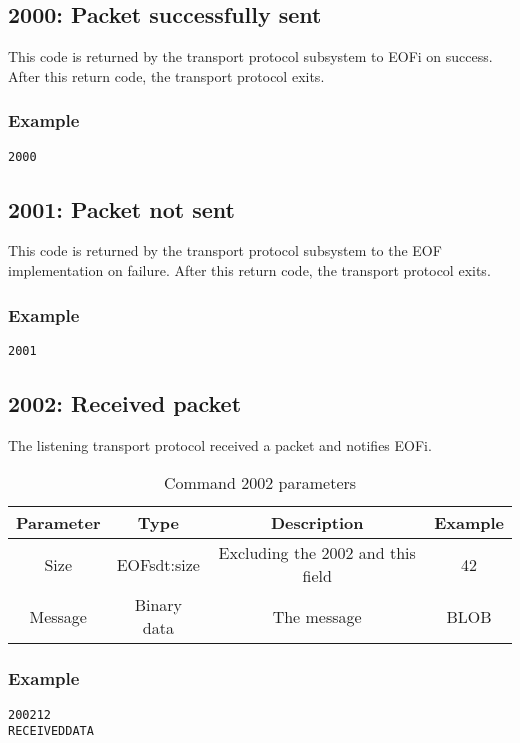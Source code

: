 \documentclass[12pt,a4paper]{book}
\begin{document}
\subsection{2000: Packet successfully sent}
This code is returned by the transport protocol subsystem to EOFi on success.
After this return code, the transport protocol exits.
\subsubsection{Example}
\begin{verbatim}
2000
\end{verbatim}
\subsection{2001: Packet not sent}
This code is returned by the transport protocol subsystem to the
EOF implementation on failure.
After this return code, the transport protocol exits.
\subsubsection{Example}
\begin{verbatim}
2001
\end{verbatim}
\subsection{2002: Received packet}
The listening transport protocol received a packet and notifies EOFi.
\begin{longtable}{|c|c|c|c|}
\caption{Command 2002 parameters}\\
\hline
\textbf{Parameter} & \textbf{Type} & \textbf{Description} & \textbf{Example}\\
\hline
Size & EOFsdt:size & Excluding the 2002 and this field & 42\\
\hline
Message & Binary data & The message & BLOB\\
\hline
\end{longtable}
\subsubsection{Example}
\begin{verbatim}
200212
RECEIVEDDATA
\end{verbatim}
\end{document}
